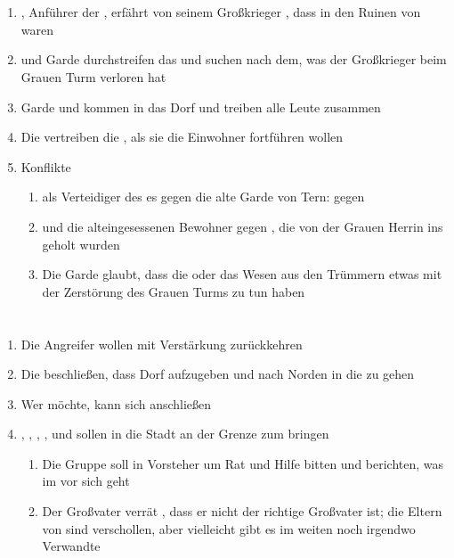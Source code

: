 \documentclass[12pt,a4paper,onecolumn,oneside,ngerman]{book}
\begin{document}
\chapter[{\Pato}{s} Rache]{}
\begin{enumerate}
  \item {\Pato}, Anführer der {\Bangiri}, erfährt von seinem Großkrieger {\Oggo}, dass {\Schattenlaufer} in den Ruinen von {\Tern} waren
  \item {\Bangiri} und Garde durchstreifen das {\Enland} und suchen nach dem, was der Großkrieger beim Grauen Turm verloren hat
  \item Garde und {\Bangiri} kommen in das Dorf {\Beron} und treiben alle Leute zusammen
  \item Die {\Schattenlaufer} vertreiben die {\Bangiri}, als sie die Einwohner fortführen wollen
  \item Konflikte
  \begin{enumerate}
    \item {\Schattenlaufer} als Verteidiger des {\Enland}es gegen die alte Garde von Tern: {\Enland} gegen {\Enland} 
    \item {\Schattenlaufer} und die alteingesessenen Bewohner gegen {\Bangiri}, die von der Grauen Herrin ins {\Enland} geholt wurden
    \item Die Garde glaubt, dass die {\Schattenlaufer} oder das Wesen aus den Trümmern etwas mit der Zerstörung des Grauen Turms zu tun haben
  \end{enumerate}
\end{enumerate}

\chapter[Der Aufbruch]{}
\begin{enumerate}
  \item Die Angreifer wollen mit Verstärkung zurückkehren
  \item Die {\Schattenlaufer} beschließen, dass Dorf {\Beron} aufzugeben und nach Norden in die {\Nordmark} zu gehen
  \item Wer möchte, kann sich anschließen
  \item {\Nox}, {\Eno}, {\Dolo}, {\Tremor}, {\Enna} und {\Enno} sollen {\Sena} in die Stadt {\Lobarn} an der Grenze zum {\Rhinland} bringen
  \begin{enumerate}
    \item Die Gruppe soll in {\Lobarn} Vorsteher {\Vester} um Rat und Hilfe bitten und berichten, was im {\Enland} vor sich geht
    \item Der Großvater verrät {\Molitor}, dass er nicht der richtige Großvater ist; die Eltern von {\Molitor} sind verschollen, aber vielleicht gibt es im weiten {\Rhinland} noch irgendwo Verwandte
  \end{enumerate}
\end{enumerate}
\end{document}
